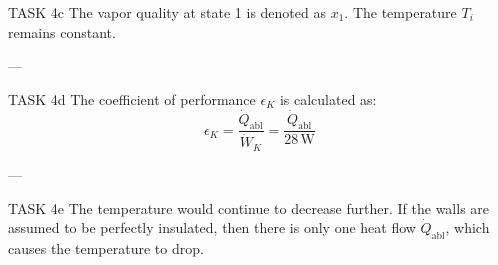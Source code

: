 TASK 4c  
The vapor quality at state 1 is denoted as \( x_1 \). The temperature \( T_i \) remains constant.

---

TASK 4d  
The coefficient of performance \( \epsilon_K \) is calculated as:  
\[
\epsilon_K = \frac{\dot{Q}_{\text{abl}}}{\dot{W}_K} = \frac{\dot{Q}_{\text{abl}}}{28 \, \text{W}}
\]

---

TASK 4e  
The temperature would continue to decrease further. If the walls are assumed to be perfectly insulated, then there is only one heat flow \( \dot{Q}_{\text{abl}} \), which causes the temperature to drop.